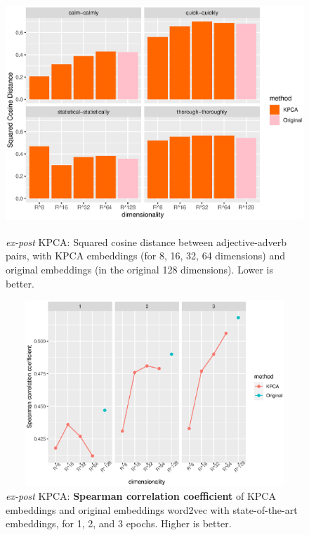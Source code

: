 \begin{figure}[H]  
\centering
\includegraphics[width=12cm,height=9cm]{./Figures/cos_dist_post.eps}
\caption{ \textit{ex-post} KPCA: Squared cosine distance between adjective-adverb pairs, with KPCA embeddings (for 8, 16, 32, 64 dimensions) and original embeddings (in the original 128 dimensions). Lower is better.} 
\label{fig:cos_dist_post}
\end{figure}


\begin{figure}[H]  
\centering
\includegraphics[width=12cm,height=7cm]{./Figures/spear_post.eps}
\caption{\textit{ex-post} KPCA: \textbf{Spearman correlation coefficient} of KPCA embeddings and original embeddings word2vec with state-of-the-art embeddings, for 1, 2, and 3 epochs. Higher is better.} 
\label{fig:spear_post}
\end{figure}




